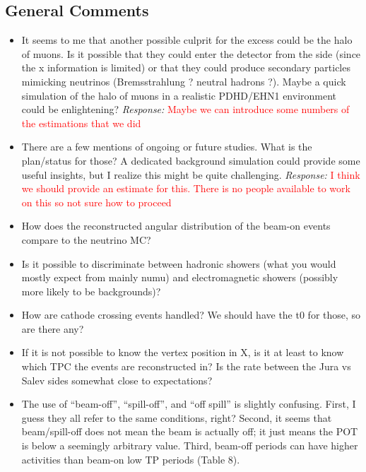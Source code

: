 \documentclass[11pt]{article}
\begin{document}
\subsection*{General Comments}
\begin{itemize}
    \item It seems to me that another possible culprit for the excess could be the halo of muons. Is it possible that they could enter the detector from the side (since the x information is limited) or that they could produce secondary particles mimicking neutrinos (Bremsstrahlung ? neutral hadrons ?). Maybe a quick simulation of the halo of muons in a realistic PDHD/EHN1 environment could be enlightening?
    \textit{Response:} \textcolor{red}{Maybe we can introduce some numbers of the estimations that we did}
    
    \item There are a few mentions of ongoing or future studies. What is the plan/status for those? A dedicated background simulation could provide some useful insights, but I realize this might be quite challenging.
     \textit{Response:} \textcolor{red}{I think we should provide an estimate for this. There is no people available to work on this so not sure how to proceed}
     
    \item How does the reconstructed angular distribution of the beam-on events compare to the neutrino MC?
    \item Is it possible to discriminate between hadronic showers (what you would mostly expect from mainly numu) and electromagnetic showers (possibly more likely to be backgrounds)?
    \item How are cathode crossing events handled? We should have the t0 for those, so are there any?
    \item If it is not possible to know the vertex position in X, is it at least to know which TPC the events are reconstructed in? Is the rate between the Jura vs Salev sides somewhat close to expectations?
    \item The use of “beam-off”, “spill-off”, and “off spill” is slightly confusing. First, I guess they all refer to the same conditions, right? Second, it seems that beam/spill-off does not mean the beam is actually off; it just means the POT is below a seemingly arbitrary value. Third, beam-off periods can have higher activities than beam-on low TP periods (Table 8).
\end{itemize}
\end{document}
